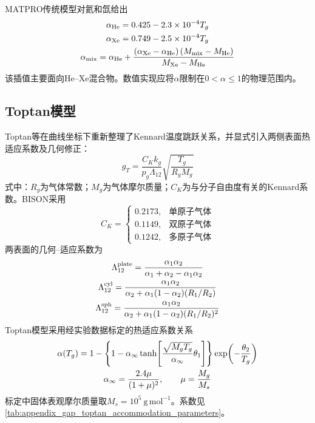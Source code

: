 MATPRO传统模型对氦和氙给出\cite{hagrmanSCDAPRELAP5MOD1995}
\begin{gather}
	\alpha_{\mathrm{He}}
	=0.425-2.3\times10^{-4}T_g
	\notag
	\\
	\alpha_{\mathrm{Xe}}
	=0.749-2.5\times10^{-4}T_g
	\notag
	\\
	\alpha_{\mathrm{mix}}
	=\alpha_{\mathrm{He}}
	+\frac{
		\left(\alpha_{\mathrm{Xe}}-\alpha_{\mathrm{He}}\right)
		\left(M_{\mathrm{mix}}-M_{\mathrm{He}}\right)}
	{M_{\mathrm{Xe}}-M_{\mathrm{He}}}
	\label{eq:appendix_gap_legacy_accommodation}
\end{gather}
该插值主要面向He--Xe混合物。数值实现应将$\alpha$限制在$0<\alpha\leq1$的物理范围内。

\subsection{Toptan模型}

Toptan等在曲线坐标下重新整理了Kennard温度跳跃关系，并显式引入两侧表面热适应系数及几何修正\cite{toptanGapConductanceModeling2019,toptanModelingGapConductance2020}：
\begin{equation}
	g_T
	=\frac{C_K k_g}{p_g\Lambda_{12}}
	\sqrt{\frac{T_g}{R_gM_g}}
	\label{eq:appendix_gap_toptan_jump_distance}
\end{equation}
式中：$R_g$为气体常数；$M_g$为气体摩尔质量；$C_K$为与分子自由度有关的Kennard系数。BISON采用
\begin{equation}
	C_K=
	\begin{cases}
		0.2173,&\text{单原子气体}\\
		0.1149,&\text{双原子气体}\\
		0.1242,&\text{多原子气体}
	\end{cases}
	\label{eq:appendix_gap_kennard_coefficients}
\end{equation}
两表面的几何--适应系数为
\begin{gather}
	\Lambda_{12}^{\mathrm{plate}}
	=\frac{\alpha_1\alpha_2}
	{\alpha_1+\alpha_2-\alpha_1\alpha_2}
	\notag
	\\
	\Lambda_{12}^{\mathrm{cyl}}
	=\frac{\alpha_1\alpha_2}
	{\alpha_2+\alpha_1(1-\alpha_2)(R_1/R_2)}
	\notag
	\\
	\Lambda_{12}^{\mathrm{sph}}
	=\frac{\alpha_1\alpha_2}
	{\alpha_2+\alpha_1(1-\alpha_2)(R_1/R_2)^2}
	\label{eq:appendix_gap_lambda_geometry}
\end{gather}
Toptan模型采用经实验数据标定的热适应系数关系
\begin{gather}
	\alpha(T_g)
	=1-
	\left\{
	1-\alpha_{\infty}
	\tanh\!\left[
	\frac{\sqrt{M_gT_g}}{\alpha_{\infty}}\theta_1
	\right]
	\right\}
	\exp\!\left(-\frac{\theta_2}{T_g}\right)
	\notag
	\\
	\alpha_{\infty}
	=\frac{2.4\mu}{(1+\mu)^2},
	\qquad
	\mu=\frac{M_g}{M_s}
	\label{eq:appendix_gap_toptan_accommodation}
\end{gather}
标定中固体表观摩尔质量取$M_s=10^5\ \mathrm{g\,mol^{-1}}$。系数见\tablename\ref{tab:appendix_gap_toptan_accommodation_parameters}。

